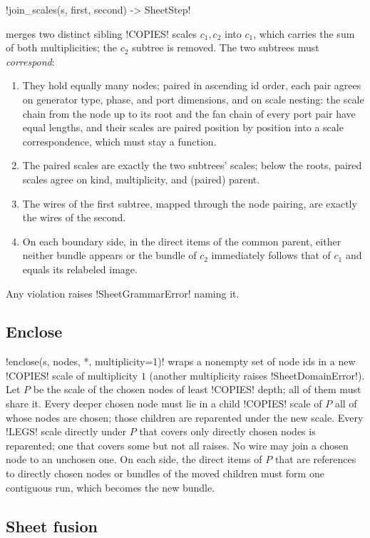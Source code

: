 \begin{signature}
\py!join_scales(s, first, second) -> SheetStep!
\end{signature}
merges two distinct sibling \code!COPIES! scales $c_1, c_2$ into $c_1$, which carries the sum of
both multiplicities; the $c_2$ subtree is removed. The two subtrees must \emph{correspond}:
\begin{enumerate}
\item They hold equally many nodes; paired in ascending id order, each pair agrees on generator
  type, phase, and port dimensions, and on scale nesting: the scale chain from the node up to its
  root and the fan chain of every port pair have equal lengths, and their scales are paired
  position by position into a scale correspondence, which must stay a function.
\item The paired scales are exactly the two subtrees' scales; below the roots, paired scales agree
  on kind, multiplicity, and (paired) parent.
\item The wires of the first subtree, mapped through the node pairing, are exactly the wires of the
  second.
\item On each boundary side, in the direct items of the common parent, either neither bundle
  appears or the bundle of $c_2$ immediately follows that of $c_1$ and equals its relabeled image.
\end{enumerate}
Any violation raises \py!SheetGrammarError! naming it.

\subsection{Enclose}

\py!enclose(s, nodes, *, multiplicity=1)! wraps a nonempty set of node ids in a new \code!COPIES!
scale of multiplicity $1$ (another multiplicity raises \py!SheetDomainError!). Let $P$ be the scale
of the chosen nodes of least \code!COPIES! depth; all of them must share it. Every deeper chosen node
must lie in a child \code!COPIES! scale of $P$ all of whose nodes are chosen; those children are
reparented under the new scale. Every \code!LEGS! scale directly under $P$ that covers only directly
chosen nodes is reparented; one that covers some but not all raises. No wire may join a chosen node
to an unchosen one. On each side, the direct items of $P$ that are references to directly chosen
nodes or bundles of the moved children must form one contiguous run, which becomes the new bundle.

\subsection{Sheet fusion}


